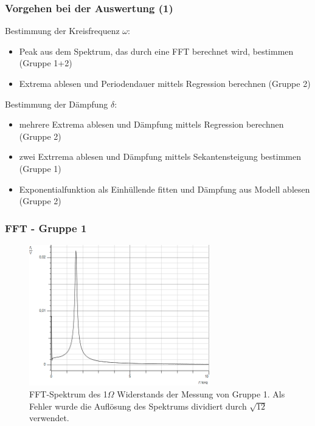 \documentclass{beamer}
\begin{document}

\begin{frame}
\frametitle{Vorgehen bei der Auswertung (1)}
Bestimmung der Kreisfrequenz $\omega$:
\begin{itemize}
\item Peak aus dem Spektrum, das durch eine FFT berechnet wird, bestimmen (Gruppe 1+2)
\item Extrema ablesen und Periodendauer mittels Regression berechnen (Gruppe 2)
\end{itemize}

Bestimmung der Dämpfung $\delta$:
\begin{itemize}
\item mehrere Extrema ablesen und Dämpfung mittels Regression berechnen (Gruppe 2)
\item zwei Extrrema ablesen und Dämpfung mittels Sekantensteigung bestimmen (Gruppe 1)
\item Exponentialfunktion als Einhüllende fitten und Dämpfung aus Modell ablesen (Gruppe 2)
\end{itemize}
\end{frame}

\begin{frame}
\frametitle{FFT - Gruppe 1}
\begin{figure}
\centering
\includegraphics[width=0.7\textwidth]{abbildungen/fft_schwingung_grp1.png}
\caption{FFT-Spektrum des 1$\Omega$ Widerstands der Messung von Gruppe 1. Als Fehler wurde die Auflösung des Spektrums dividiert durch $\sqrt{12}$ verwendet.}
\end{figure}
\end{frame}
\end{document}
